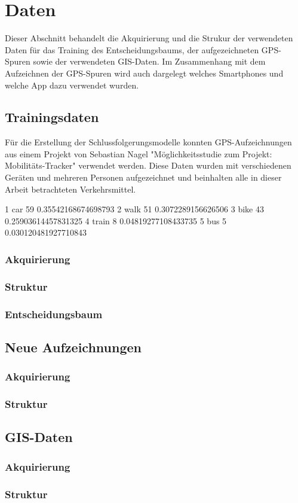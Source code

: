 \chapter{Daten}
Dieser Abschnitt behandelt die Akquirierung und die Strukur der verwendeten Daten für das Training des Entscheidungsbaums, der aufgezeichneten GPS-Spuren sowie der verwendeten GIS-Daten. Im Zusammenhang mit dem Aufzeichnen der GPS-Spuren wird auch dargelegt welches Smartphones und welche App dazu verwendet wurden.

\pagebreak

\section{Trainingsdaten}
Für die Erstellung der Schlussfolgerungsmodelle konnten GPS-Aufzeichnungen aus einem Projekt von Sebastian Nagel "Möglichkeitsstudie zum Projekt: Mobilitäts-Tracker" verwendet werden. Diese Daten wurden mit verschiedenen Geräten und mehreren Personen aufgezeichnet und beinhalten alle in dieser Arbeit betrachteten Verkehrsmittel. \cite{sebastian_nagel_moglichkeitsstudie_2011}

1	car	59	0.35542168674698793
2	walk	51	0.3072289156626506
3	bike	43	0.25903614457831325
4	train	8	0.04819277108433735
5	bus	5	0.030120481927710843



\subsection{Akquirierung}
\subsection{Struktur}
\subsection{Entscheidungsbaum}

\section{Neue Aufzeichnungen}
\subsection{Akquirierung}
\subsection{Struktur}

\section{GIS-Daten}
\subsection{Akquirierung}
\subsection{Struktur}

